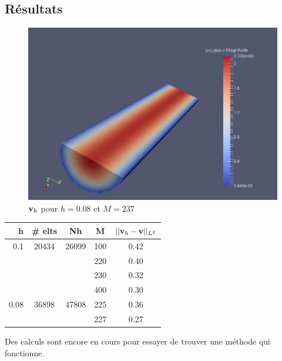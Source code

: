 \documentclass[a4paper,11pt]{article}
\begin{document}
\subsection{Résultats}
\begin{figure}[H]
  \centering
  \includegraphics[scale=0.4]{vh}
  \caption{${\mathbf{v}}_h$ pour $h=0.08$ et $M=237$}
\end{figure}

\begin{table}[H]
  \centering
  \begin{tabular}{r|c|c||c|c}
    h & \# elts & Nh & M & $||{\mathbf{v}}_h-{\mathbf{v}}||_{L^2}$ \\
    \hline
    0.1 & 20434 & 26099 & 100 & 0.42 \\
    & & & 220 & 0.40 \\
    & & & 230 & 0.32 \\
    & & & 400 & 0.30 \\
    \hline
    0.08 & 36898 & 47808 & 225 & 0.36 \\
    & & & 227 & 0.27
  \end{tabular}
\end{table}

Des calculs sont encore en cours pour essayer de trouver une méthode qui fonctionne.
\fi
\end{document}
